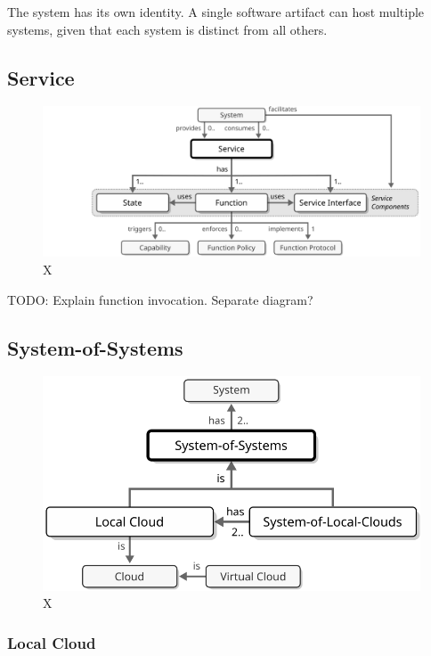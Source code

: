 The system has its own identity. A single software artifact can host multiple systems, given that each system is distinct from all others.

\subsection{Service}
\label{sec:reference-model:service}

\begin{figure}[ht!]
  \centering
  \includegraphics{figures/service}
  \caption{
    X
  }
  \label{fig:service}
\end{figure}

TODO: Explain function invocation. Separate diagram?

\subsection{System-of-Systems}
\label{sec:reference-model:system-of-systems}

\begin{figure}[ht!]
  \centering
  \includegraphics{figures/system-of-systems}
  \caption{
    X
  }
  \label{fig:system-of-systems}
\end{figure}

\subsubsection{Local Cloud}
\label{sec:reference-model:system-of-systems:local-cloud}

